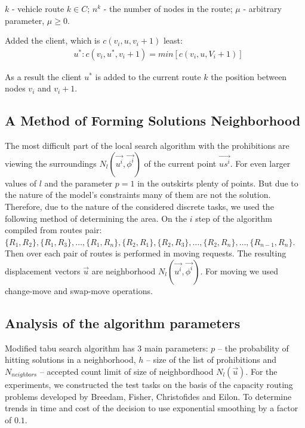 \documentclass[]{TAACpaper}
\begin{document}
$k$ - vehicle route $k\in C$;
$n^k$ - the number of nodes in the route;
$\mu$ - arbitrary parameter, $\mu \ge 0 $.

Added the client, which is $c(v_i,u,v_i+1)$ least:
\begin{align} 
& u^*:c(v_i,u^*,v_i+1)=min[c(v_i,u,V_i+1)]
\end{align}	

As a result the client $u^*$ is added to the current route $k$ the position between nodes $v_i$ and $v_i+1$.

\subsection{A Method of Forming Solutions Neighborhood}
The most difficult part of the local search algorithm with the prohibitions are viewing the surroundings $N_l(\vec{u^i},\vec{\phi^i})$ of the current point $\vec{us^i}$. For even larger values of $l$ and the parameter $p=1$ in the outskirts plenty of points. But due to the nature of the model's constraints many of them are not the solution. Therefore, due to the nature of the considered discrete tasks, we used the following method of determining the area. On the $i$ step of the algorithm compiled from routes pair: $\{R_1,R_2\},\{R_1,R_3\},\dots,\{R_1,R_n\},\{R_2,R_1\}, \{R_2,R_3\},\dots,\{R_2,R_n\},\dots,\{R_{n-1},R_{n}\}$. Then over each pair of routes is performed in moving requests. The resulting displacement vectors $\vec{u}$ are neighborhood $N_l(\vec{u^i},\vec{\phi^i})$. For moving  we used change-move  and swap-move operations.


\subsection{Analysis of the algorithm parameters}
Modified tabu search algorithm has 3 main parameters: $p$ -- the probability of hitting solutions in a neighborhood, $h$ -- size of the list of prohibitions and $N_{neighbors}$ -- accepted count limit of size of neighbordhood $N_l(\vec{u})$. For the experiments, we constructed the test tasks on the basis of the capacity routing problems developed by Breedam, Fisher, Christofides and Eilon. To determine trends in time and cost of the decision to use exponential smoothing by a factor of $0.1$.
\end{document}
